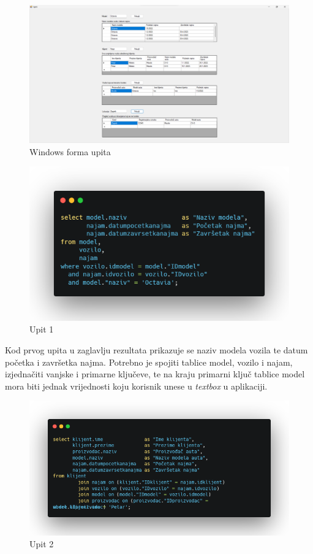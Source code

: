 \documentclass[]{foi}
\begin{document}
\vspace{20mm}

\begin{figure}[!ht]
    \centering
    \includegraphics[width=1\textwidth]{slike/upit.png}
    \caption{Windows forma upita}
    \label{fig:upit}
\end{figure}
\newpage

\begin{figure}[!ht]
    \centering
    \includegraphics[width=1\textwidth]{slike/u1.png}
    \caption{Upit 1}
    \label{fig:upit1}
\end{figure}

Kod prvog upita u zaglavlju rezultata prikazuje se naziv modela vozila te datum početka i završetka najma. Potrebno je spojiti tablice model, vozilo i najam, izjednačiti vanjske i primarne ključeve, te na kraju primarni ključ tablice model mora biti jednak vrijednosti koju korisnik unese u \textit{textbox} u aplikaciji.

\begin{figure}[!ht]
    \centering
    \includegraphics[width=1\textwidth]{slike/u2.png}
    \caption{Upit 2}
    \label{fig:upit2}
\end{figure}
\end{document}

